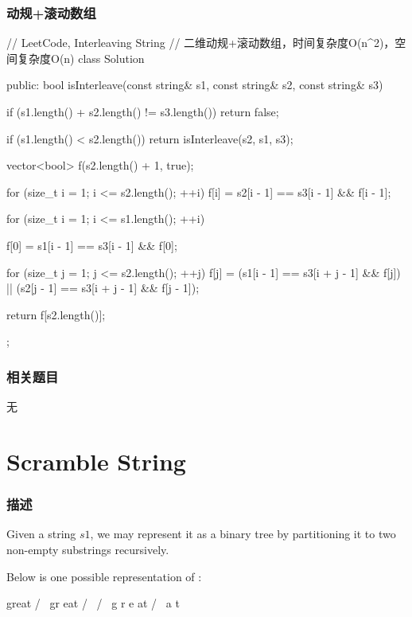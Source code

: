 \subsubsection{动规+滚动数组}
\begin{Code}
// LeetCode, Interleaving String
// 二维动规+滚动数组，时间复杂度O(n^2)，空间复杂度O(n)
class Solution {
public:
    bool isInterleave(const string& s1, const string& s2, const string& s3) {
        if (s1.length() + s2.length() != s3.length())
            return false;

        if (s1.length() < s2.length())
            return isInterleave(s2, s1, s3);

        vector<bool> f(s2.length() + 1, true);

        for (size_t i = 1; i <= s2.length(); ++i)
            f[i] = s2[i - 1] == s3[i - 1] && f[i - 1];

        for (size_t i = 1; i <= s1.length(); ++i) {
            f[0] = s1[i - 1] == s3[i - 1] && f[0];

            for (size_t j = 1; j <= s2.length(); ++j)
                f[j] = (s1[i - 1] == s3[i + j - 1] && f[j])
                        || (s2[j - 1] == s3[i + j - 1] && f[j - 1]);
        }

        return f[s2.length()];
    }
};
\end{Code}


\subsubsection{相关题目}
\begindot
\item 无
\myenddot


\section{Scramble String} %
\label{sec:scramble-string}


\subsubsection{描述}
Given a string $s1$, we may represent it as a binary tree by partitioning it to two non-empty substrings recursively.

Below is one possible representation of :
\begin{Code}
    great
   /    \
  gr    eat
 / \    /  \
g   r  e   at
           / \
          a   t
\end{Code}

